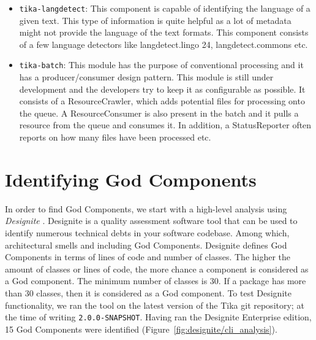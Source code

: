 \documentclass{article}
\begin{document}
\begin{itemize}
    \item\texttt{tika-langdetect}: This component is capable of identifying the language of a given text. This type of information is quite helpful as a lot of metadata might not provide the language of the text formats. This component consists of a few language detectors like langdetect.lingo 24, langdetect.commons etc. 
    \item\texttt{tika-batch}: This module has the purpose of conventional processing and it has a producer/consumer design pattern. This module is still under development and the developers try to keep it as configurable as possible. It consists of a ResourceCrawler, which adds potential files for processing onto the queue. A ResourceConsumer is also present in the batch and it pulls a resource from the queue and consumes it. In addition, a StatusReporter often reports on how many files have been processed etc.
    \end{itemize}





\section{Identifying God Components}
In order to find God Components, we start with a high-level analysis using \textit{Designite} \citep{sharma2016designite}. Designite is a quality assessment software tool that can be used to identify numerous technical debts in your software codebase. Among which, architectural smells and including God Components. Designite defines God Components in terms of lines of code and number of classes. The higher the amount of classes or lines of code, the more chance a component is considered as a God component. The minimum number of classes is 30. If a package has more than 30 classes, then it is considered as a God component. 
To test Designite functionality, we ran the tool on the latest version of the Tika git repository; at the time of writing \texttt{2.0.0-SNAPSHOT}. Having ran the Designite Enterprise edition, 15 God Components were identified (Figure~\ref{fig:designite/cli_analysis}).
\end{document}
